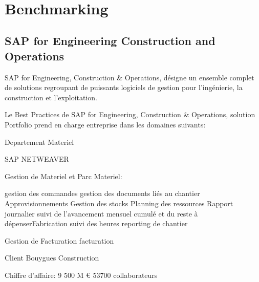 \documentclass[a4paper]{article}
\begin{document}
\maketitle

\hfill\\
\section{Benchmarking}
\subsection{SAP for Engineering Construction and Operations}
SAP for Engineering, Construction & Operations, désigne un ensemble complet de solutions regroupant de puissants logiciels de gestion pour l’ingénierie, la construction et l’exploitation.

Le Best Practices de SAP for Engineering, Construction & Operations, solution Portfolio prend en charge entreprise dans les domaines suivants:

{Departement Materiel}

SAP NETWEAVER

Gestion de Materiel et Parc Materiel: 

	gestion des commandes
	gestion des documents liés au chantier
	Approvisionnements
	Gestion des stocks
	Planning des ressources
	Rapport journalier 
	suivi de l’avancement mensuel cumulé et du reste à dépenserFabrication
	suivi des heures
	reporting de chantier
	 
Gestion de Facturation
	facturation

Client Bouygues Construction

Chiffre d'affaire: 9 500 M €
53700 collaborateurs
\end{document}
